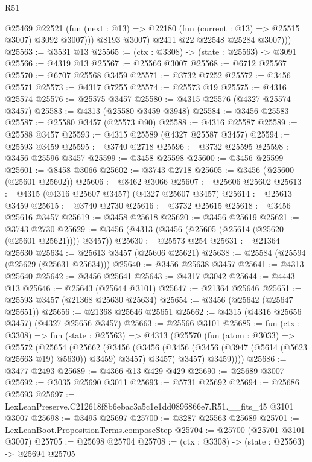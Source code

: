 \begin{lexlean}{R51}
\begin{coremodule}
                @25469
                @22521
                (fun (next : @13) => @22180 (fun (current : @13) => @25515 @3007) @3092 @3007)))
            @8193
            @3007)
          @2411
          @22
          @22548
          @25284
          @3007)))
@25563 := @3531 @13
@25565 := (ctx : @3308) -> (state : @25563) -> @3091
@25566 := @4319 @13
@25567 := @25566 @3007
@25568 := @6712 @25567
@25570 := @6707 @25568 @3459
@25571 := @3732 @7252
@25572 := @3456 @25571
@25573 := @4317 @7255
@25574 := @25573 @19
@25575 := @4316 @25574
@25576 := @25575 @3457
@25580 := @4315 @25576 (@4327 @25574 @3457)
@25583 := @4313 (@25580 @3459 @3948)
@25584 := @3456 @25583
@25587 := @25580 @3457 (@25573 @90)
@25588 := @4316 @25587
@25589 := @25588 @3457
@25593 := @4315 @25589 (@4327 @25587 @3457)
@25594 := @25593 @3459
@25595 := @3740 @2718
@25596 := @3732 @25595
@25598 := @3456 @25596 @3457
@25599 := @3458 @25598
@25600 := @3456 @25599
@25601 := @8458 @3066
@25602 := @3743 @2718
@25605 := @3456 (@25600 (@25601 @25602))
@25606 := @8462 @3066
@25607 := @25606 @25602
@25613 := @4315 (@4316 @25607 @3457) (@4327 @25607 @3457)
@25614 := @25613 @3459
@25615 := @3740 @2730
@25616 := @3732 @25615
@25618 := @3456 @25616 @3457
@25619 := @3458 @25618
@25620 := @3456 @25619
@25621 := @3743 @2730
@25629 := @3456 (@4313 (@3456 (@25605 (@25614 (@25620 (@25601 @25621)))) @3457))
@25630 := @25573 @254
@25631 := @21364 @25630
@25634 := @25613 @3457 (@25606 @25621)
@25638 := @25584 (@25594 (@25629 (@25631 @25634)))
@25640 := @3456 @25638 @3457
@25641 := @4313 @25640
@25642 := @3456 @25641
@25643 := @4317 @3042
@25644 := @4443 @13
@25646 := @25643 (@25644 @3101)
@25647 := @21364 @25646
@25651 := @25593 @3457 (@21368 @25630 @25634)
@25654 := @3456 (@25642 (@25647 @25651))
@25656 := @21368 @25646 @25651
@25662 := @4315 (@4316 @25656 @3457) (@4327 @25656 @3457)
@25663 := @25566 @3101
@25685 := fun (ctx : @3308) =>
  fun (state : @25563) =>
  @4313
    (@25570
      (fun (atom : @3033) =>
      @25572
        (@25654
          (@25662
            (@3456
              (@3456 (@3456 (@3456 (@3947 (@5614 (@5623 @25663 @19) @5630)) @3459) @3457) @3457)
              @3457)
            @3459))))
@25686 := @3477 @2493
@25689 := @4366 @13 @429 @429
@25690 := @25689 @3007
@25692 := @3035 @25690 @3011
@25693 := @5731 @25692
@25694 := @25686 @25693
@25697 := LexLeanPreserve.C212618f8b6ebac3a5c1e1dd0896866e7.R51.__fits_45 @3101 @3007
@25698 := @3495 @25697
@25700 := @3287 @25563 @25689
@25701 := LexLeanBoot.PropositionTerms.composeStep
@25704 := @25700 (@25701 @3101 @3007)
@25705 := @25698 @25704
@25708 := (ctx : @3308) -> (state : @25563) -> @25694 @25705

\end{coremodule}
\end{lexlean}
